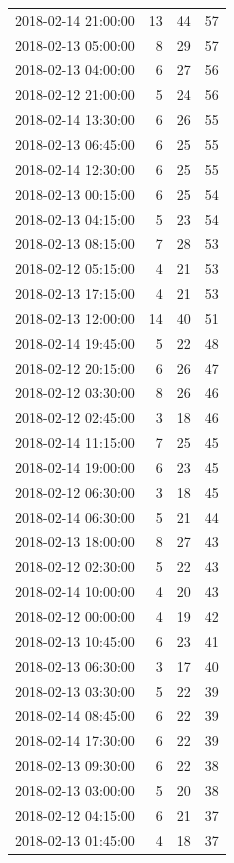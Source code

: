 \begin{tabular}{lrrr}
2018-02-14 21:00:00 & 13 & 44 & 57 \\
2018-02-13 05:00:00 & 8 & 29 & 57 \\
2018-02-13 04:00:00 & 6 & 27 & 56 \\
2018-02-12 21:00:00 & 5 & 24 & 56 \\
2018-02-14 13:30:00 & 6 & 26 & 55 \\
2018-02-13 06:45:00 & 6 & 25 & 55 \\
2018-02-14 12:30:00 & 6 & 25 & 55 \\
2018-02-13 00:15:00 & 6 & 25 & 54 \\
2018-02-13 04:15:00 & 5 & 23 & 54 \\
2018-02-13 08:15:00 & 7 & 28 & 53 \\
2018-02-12 05:15:00 & 4 & 21 & 53 \\
2018-02-13 17:15:00 & 4 & 21 & 53 \\
2018-02-13 12:00:00 & 14 & 40 & 51 \\
2018-02-14 19:45:00 & 5 & 22 & 48 \\
2018-02-12 20:15:00 & 6 & 26 & 47 \\
2018-02-12 03:30:00 & 8 & 26 & 46 \\
2018-02-12 02:45:00 & 3 & 18 & 46 \\
2018-02-14 11:15:00 & 7 & 25 & 45 \\
2018-02-14 19:00:00 & 6 & 23 & 45 \\
2018-02-12 06:30:00 & 3 & 18 & 45 \\
2018-02-14 06:30:00 & 5 & 21 & 44 \\
2018-02-13 18:00:00 & 8 & 27 & 43 \\
2018-02-12 02:30:00 & 5 & 22 & 43 \\
2018-02-14 10:00:00 & 4 & 20 & 43 \\
2018-02-12 00:00:00 & 4 & 19 & 42 \\
2018-02-13 10:45:00 & 6 & 23 & 41 \\
2018-02-13 06:30:00 & 3 & 17 & 40 \\
2018-02-13 03:30:00 & 5 & 22 & 39 \\
2018-02-14 08:45:00 & 6 & 22 & 39 \\
2018-02-14 17:30:00 & 6 & 22 & 39 \\
2018-02-13 09:30:00 & 6 & 22 & 38 \\
2018-02-13 03:00:00 & 5 & 20 & 38 \\
2018-02-12 04:15:00 & 6 & 21 & 37 \\
2018-02-13 01:45:00 & 4 & 18 & 37 \\

\end{tabular}
